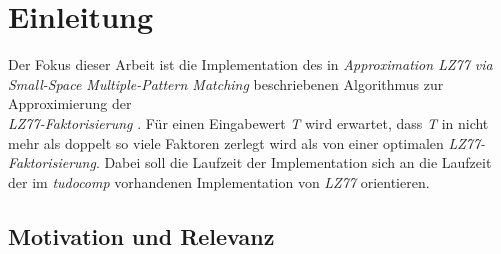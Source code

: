 	\chapter{Einleitung}
	
	Der Fokus dieser Arbeit ist die Implementation des  in {\it Approximation LZ77 via Small-Space Multiple-Pattern Matching}  beschriebenen Algorithmus zur Approximierung der \\ \textit{LZ77-Faktorisierung} \cite{LZ77Approx}.
	Für einen Eingabewert \textit{T} wird erwartet, dass \textit{T} in nicht mehr als doppelt so viele Faktoren zerlegt wird als von einer optimalen \textit{LZ77-Faktorisierung}.
	Dabei soll die Laufzeit der Implementation sich an die Laufzeit der im \textit{tudocomp} vorhandenen Implementation von \textit{LZ77} orientieren. 
	\section{Motivation und Relevanz}
	
